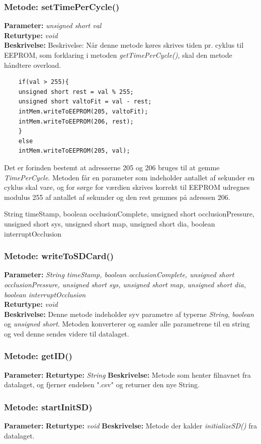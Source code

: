 \subsubsection{Metode: setTimePerCycle()}
\textbf{Parameter: } \textit{unsigned short val}
\\ \textbf{Returtype: } \textit{void}
\\ \textbf{Beskrivelse: } Beskrivelse: Når denne metode køres skrives tiden pr. cyklus til EEPROM, som forklaring i metoden \textit{getTimePerCycle()}, skal den metode håndtere overload. 
\begin{lstlisting}
	if(val > 255){
	unsigned short rest = val % 255;
	unsigned short valtoFit = val - rest;
	intMem.writeToEEPROM(205, valtoFit);
	intMem.writeToEEPROM(206, rest);
	}
	else
	intMem.writeToEEPROM(205, val);
\end{lstlisting}
Det er forinden bestemt at adresserne 205 og 206 bruges til at gemme \textit{TimePerCycle}. Metoden får en parameter som indeholder antallet af sekunder en cyklus skal vare, og for sørge for værdien skrives korrekt til EEPROM udregnes modulus 255 af antallet af sekunder og den rest gemmes på adressen 206. 

String timeStamp, boolean occlusionComplete, unsigned short occlusionPressure, unsigned short sys, unsigned short map, unsigned short dia, boolean interruptOcclusion

\subsubsection{Metode: writeToSDCard()}
\textbf{Parameter: } \textit{String timeStamp, boolean occlusionComplete, unsigned short occlusionPressure, unsigned short sys, unsigned short map, unsigned short dia, boolean interruptOcclusion}
\\ \textbf{Returtype: } \textit{void}
\\ \textbf{Beskrivelse: }  Denne metode indeholder syv parametre af typerne \textit{String}, \textit{boolean} og \textit{unsigned short}. Metoden konverterer og samler alle parametrene til en string og ved denne sendes videre til datalaget.

\subsubsection{Metode: getID()}
\textbf{Parameter: }\textit{}
\textbf{Returtype: } \textit{String}
\textbf{Beskrivelse: } Metode som henter filnavnet fra datalaget, og fjerner endelsen ".csv" og returner den nye String. 

\subsubsection{Metode: startInitSD)}
\textbf{Parameter: }\textit{}
\textbf{Returtype: } \textit{void}
\textbf{Beskrivelse: } Metode der kalder \textit{initializeSD()} fra datalaget. 